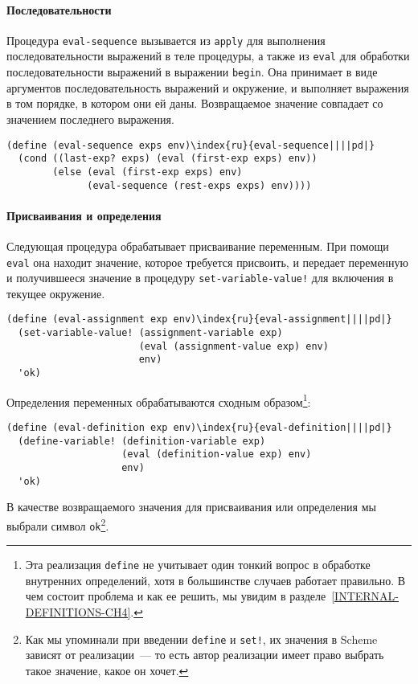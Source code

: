 \paragraph{Последовательности}


Процедура {\tt eval-sequence} вызывается из
{\tt apply} для выполнения последовательности выражений в теле
процедуры, а также из {\tt eval} для обработки
последовательности выражений в выражении {\tt begin}.  Она
принимает в виде аргументов последовательность выражений и окружение,
и выполняет выражения в том порядке, в котором они ей даны.
Возвращаемое значение совпадает со значением последнего выражения.

\begin{Verbatim}[fontsize=\small]
(define (eval-sequence exps env)\index{ru}{eval-sequence||||pd|}
  (cond ((last-exp? exps) (eval (first-exp exps) env))
        (else (eval (first-exp exps) env)
              (eval-sequence (rest-exps exps) env))))
\end{Verbatim}

\paragraph{Присваивания и определения}


Следующая процедура обрабатывает присваивание
переменным.  При помощи {\tt eval} она находит значение,
которое требуется присвоить, и передает переменную и получившееся
значение в процедуру {\tt set-variable-value!} для включения в
текущее окружение.

\begin{Verbatim}[fontsize=\small]
(define (eval-assignment exp env)\index{ru}{eval-assignment||||pd|}
  (set-variable-value! (assignment-variable exp)
                       (eval (assignment-value exp) env)
                       env)
  'ok)
\end{Verbatim}
Определения переменных обрабатываются сходным образом\footnote{Эта 
реализация {\tt define} не учитывает один
тонкий вопрос в обработке внутренних определений, хотя в большинстве
случаев работает правильно.  В чем состоит проблема и как ее
решить, мы увидим в разделе~\ref{INTERNAL-DEFINITIONS-CH4}.}:

\begin{Verbatim}[fontsize=\small]
(define (eval-definition exp env)\index{ru}{eval-definition||||pd|}
  (define-variable! (definition-variable exp)
                    (eval (definition-value exp) env)
                    env)
  'ok)
\end{Verbatim}
В качестве возвращаемого значения для присваивания или определения мы
выбрали символ {\tt ok}\footnote{Как мы упоминали при введении {\tt define} и
{\tt set!}, их значения в Scheme зависят от реализации~--- то
есть автор реализации имеет право выбрать такое значение, какое он хочет.}.

